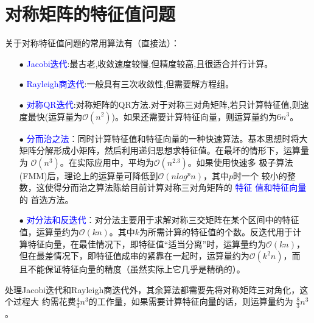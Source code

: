\documentclass[12pt,a4paper]{article}
\begin{document}
\section{对称矩阵的特征值问题}
关于对称特征值问题的常用算法有（直接法）：
\begin{itemize}
	\item[$\bullet$] \textcolor{blue}{Jacobi迭代}:最古老,收敛速度较慢,但精度较高,且很适合并行计算。
	\item[$\bullet$] \textcolor{blue}{Rayleigh商迭代}:一般具有三次收敛性,但需要解方程组。
	\item[$\bullet$] \textcolor{blue}{对称QR迭代}:对称矩阵的QR方法.对于对称三对角矩阵,若只计算特征值,则速
	度最快(运算量为$\mathcal O(n^2)$)。如果还需要计算特征向量，则运算量约为$6n^3$。
	\item[$\bullet$] \textcolor{blue}{分而治之法}：同时计算特征值和特征向量的一种快速算法。基本思想时将大
	矩阵分解形成小矩阵，然后利用递归思想求特征值。在最坏的情形下，运算量为
	$\mathcal O(n^3)$。在实际应用中，平均为$\mathcal O(n^{2.3})$。如果使用快速多
	极子算法(FMM)后，理论上的运算量可降低到$\mathcal O(nlog^p n)$，其中$p$时一个
	较小的整数，这使得分而治之算法陈给目前计算对称三对角矩阵的 \textcolor{blue}{特征
		值和特征向量}的
	首选方法。
	\item[$\bullet$] \textcolor{blue}{对分法和反迭代}：对分法主要用于求解对称三交矩阵在某个区间中的特征
	值，运算量约为$\mathcal O(kn)$。其中$k$为所需计算的特征值的个数。反迭代用于计
	算特征向量，在最佳情况下，即特征值“适当分离”时，运算量约为$\mathcal O(kn)$，
	但在最差情况下，即特征值成串的紧靠在一起时，运算量约为$\mathcal O(k^2n)$，而
	且不能保证特征向量的精度（虽然实际上它几乎是精确的）。
\end{itemize}

处理Jacobi迭代和Rayleigh商迭代外，其余算法都需要先将对称矩阵三对角化，这个过程大
约需花费$\frac{4}{3} n^3$的工作量，如果需要计算特征向量的话，则运算量约为
$\frac{8}{3}n^3$。
\end{document}
